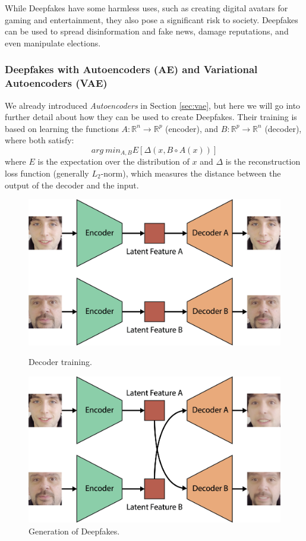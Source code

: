 \documentclass[preprint]{elsarticle}
\begin{document}
While Deepfakes have some harmless uses, such as creating digital avatars for gaming and entertainment, they also pose a significant risk to society. 
Deepfakes can be used to spread disinformation and fake news, damage reputations, and even manipulate elections.

\subsubsection{Deepfakes with Autoencoders (AE) and Variational Autoencoders (VAE)} \label{sec:deep-vae}
We already introduced \emph{Autoencoders} \cite{bank2021autoencoders} in Section \ref{sec:vae}, 
but here we will go into further detail 
about how they can be used to create Deepfakes.
Their training is based on learning the functions $A : \mathbb{R}^n \rightarrow \mathbb{R}^p$ (encoder), 
and $B:\mathbb{R}^p \rightarrow \mathbb{R}^n$ (decoder), where both satisfy:
\begin{equation}
	arg~min_{A,B}E[\Delta(x,B \circ A(x))]
\end{equation}
where $E$ is the expectation over the distribution of $x$ and $\Delta$ is the reconstruction loss function (generally
$L_2$-norm), which measures the distance between the output of the decoder and the input.



\begin{figure}[t]
	\centering
    \includegraphics[scale=0.6, keepaspectratio]{img/background_img/Training-AE.png}
    \caption{Decoder training.}\label{fig:training-ae}
	\includegraphics[scale=0.6, keepaspectratio]{img/background_img/Generation-AE2.png}
	\caption{Generation of Deepfakes.}\label{fig:generation-ae}
\end{figure}
\end{document}

